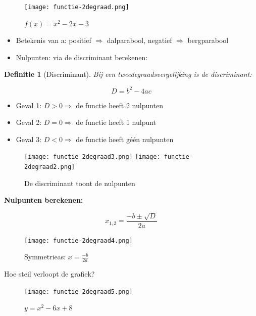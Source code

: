 \documentclass{article}
\newtheorem{theorem}{Definitie}[section]
\begin{document}
\begin{figure}[H]
    \centering
    \texttt{[image: functie-2degraad.png]}
    \caption{$f(x) = x^2 - 2x - 3$}
\end{figure}

\begin{itemize}
    \item Betekenis van a: positief $\Rightarrow$ dalparabool, negatief $\Rightarrow$ bergparabool
    \item Nulpunten: via de discriminant berekenen:
\end{itemize}

\begin{theorem}[Discriminant]
Bij een tweedegraadsvergelijking is de discriminant:

\begin{equation}
    D = b^2 - 4ac
\end{equation}
\end{theorem}

\begin{itemize}
    \item Geval 1: $D > 0 \Rightarrow$ de functie heeft 2 nulpunten
    \item Geval 2: $D = 0 \Rightarrow$ de functie heeft 1 nulpunt
    \item Geval 3: $D < 0 \Rightarrow$ de functie heeft géén nulpunten
\end{itemize}

\begin{figure}[H]
    \centering
    \texttt{[image: functie-2degraad3.png]}
    \texttt{[image: functie-2degraad2.png]}
    \caption{De discriminant toont de nulpunten}
\end{figure}

\textbf{Nulpunten berekenen:} 

\begin{equation}
    x_{1,2} = \frac{-b \pm \sqrt{D}}{2a}
\end{equation}

\begin{figure}[H]
    \centering
    \texttt{[image: functie-2degraad4.png]}
    \caption{Symmetrieas: $x = \frac{-b}{2a}$}
\end{figure}

Hoe steil verloopt de grafiek? 

\begin{figure}[H]
    \centering
    \texttt{[image: functie-2degraad5.png]}
    \caption{$y = x^2 - 6x + 8$}
\end{figure}
\end{document}
